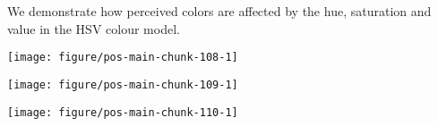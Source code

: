 \documentclass[krantz2]{krantz}\usepackage{knitr}%
\begin{document}
We demonstrate how perceived colors are affected by the hue, saturation and value in the HSV colour model.

\begin{knitrout}\footnotesize
{}\color{fgcolor}\begin{kframe}
\begin{alltt}
\hlstd{(}\hlstd{(}\hlstd{, (}\hlopt{:}\hlstd{)}\hlopt{/}\hlstd{,} \hlstd{),}  \hlstd{=} \hlstd{)} \hlopt{+}
  \hlstd{(}\hlstd{,} \hlstd{)}
\end{alltt}
\end{kframe}

{\centering \texttt{[image: figure/pos-main-chunk-108-1]} 

}



\end{knitrout}

\begin{knitrout}\footnotesize
{}\color{fgcolor}\begin{kframe}
\begin{alltt}
\hlstd{(}\hlstd{(}\hlstd{,} \hlstd{, (}\hlopt{:}\hlstd{)}\hlopt{/}\hlstd{),}  \hlstd{=} \hlstd{)} \hlopt{+}
  \hlstd{(}\hlstd{,} \hlstd{)}
\end{alltt}
\end{kframe}

{\centering \texttt{[image: figure/pos-main-chunk-109-1]} 

}



\end{knitrout}

\begin{knitrout}\footnotesize
{}\color{fgcolor}\begin{kframe}
\begin{alltt}
\hlstd{(}\hlstd{((}\hlopt{:}\hlstd{)}\hlopt{/}\hlstd{,} \hlstd{,} \hlstd{),}  \hlstd{=} \hlstd{)} \hlopt{+}
  \hlstd{(}\hlstd{,} \hlstd{)}
\end{alltt}
\end{kframe}

{\centering \texttt{[image: figure/pos-main-chunk-110-1]} 

}



\end{knitrout}
\end{document}
